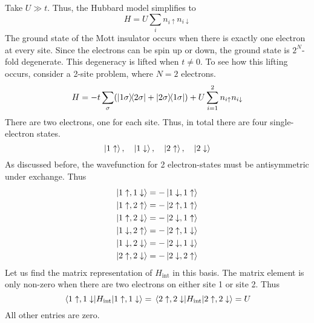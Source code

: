 \documentclass[12pt,a4paper,titlepage]{article}
\newcommand{\trm}[1]{\textrm{#1}} %
\newcommand{\up}{\uparrow} %
\newcommand{\dn}{\downarrow} %
\begin{document}
Take $U\gg t$. Thus, the Hubbard model simplifies to
\begin{equation}
H=U\sum_{i}n_{i\up}n_{i\dn}
\end{equation}
The ground state of the Mott insulator occurs when there is exactly one electron at every site. Since the electrons can be spin up or down, the ground state is $2^{N}$-fold degenerate. This degeneracy is lifted when $t\neq0$. To see how this lifting occurs, consider a 2-site problem, where $N=2$ electrons.
\begin{equation}
H=-t\sum_{\sigma}(\ketbra{1\sigma}{2\sigma}+\ketbra{2\sigma}{1\sigma})+U\sum_{i=1}^{2}n_{i\up}n_{i\dn}
\end{equation}
There are two electrons, one for each site. Thus, in total there are four single-electron states.
\[
\ket{1\up},\quad\ket{1\dn},\quad\ket{2\up},\quad\ket{2\dn}
\]
As discussed before, the wavefunction for 2 electron-states must be antisymmetric under exchange. Thus
\begin{equation}
\begin{aligned}
\ket{1\up,1\dn}&=-\ket{1\dn,1\up}\\
\ket{1\up,2\up}&=-\ket{2\up,1\up}\\
\ket{1\up,2\dn}&=-\ket{2\dn,1\up}\\
\ket{1\dn,2\up}&=-\ket{2\up,1\dn}\\
\ket{1\dn,2\dn}&=-\ket{2\dn,1\dn}\\
\ket{2\up,2\dn}&=-\ket{2\dn,2\up}
\end{aligned}
\end{equation}
Let us find the matrix representation of $H_{\trm{int}}$ in this basis. The matrix element is only non-zero when there are two electrons on either site 1 or site 2. Thus
\begin{equation}
\mel{1\up,1\dn}{H_{\trm{int}}}{1\up,1\dn}=\mel{2\up,2\dn}{H_{\trm{int}}}{2\up,2\dn}=U
\end{equation}
All other entries are zero.\\
\end{document}
